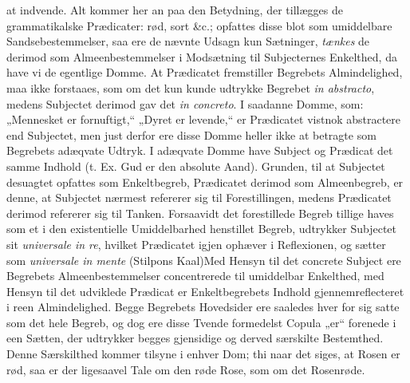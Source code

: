 \documentclass[12pt]{book}
\newcommand{\opage}[1]{\marginnote{\footnotesize\textit{[#1]}}}
\begin{document}
at indvende. Alt kommer her an
\opage{40} paa den Betydning, der tillægges de grammatikalske Prædicater: rød, sort \&c.;
opfattes disse blot som umiddelbare Sandsebestemmelser, saa ere de nævnte Udsagn
kun Sætninger, \emph{tænkes} de derimod som Almeenbestemmelser i Modsætning til
Subjecternes Enkelthed, da have vi de egentlige Domme. At Prædicatet fremstiller
Begrebets Almindelighed, maa ikke forstaaes, som om det kun kunde udtrykke
Begrebet \textit{in abstracto}, medens Subjectet derimod gav det
\textit{in concreto}. I saadanne Domme, som: „Mennesket er fornuftigt,“ „Dyret er
levende,“ er Prædicatet vistnok abstractere end Subjectet, men just derfor ere
disse Domme heller ikke at betragte som Begrebets adæqvate Udtryk. I adæqvate
Domme have Subject og Prædicat det samme Indhold (t. Ex. Gud er den absolute
Aand). Grunden, til at Subjectet desuagtet opfattes som Enkeltbegreb, Prædicatet
derimod som Almeenbegreb, er denne, at Subjectet nærmest refererer sig til
Forestillingen, medens Prædicatet derimod refererer sig til Tanken. Forsaavidt
det forestillede Begreb tillige haves som et i den existentielle Umiddelbarhed
henstillet Begreb, udtrykker Subjectet sit \textit{universale in re}, hvilket
Prædicatet igjen ophæver i Reflexionen, og sætter som \textit{universale in
mente} (Stilpons Kaal)\quad Med Hensyn til det concrete Subject ere Begrebets
Almeenbestemmelser concentrerede til umiddelbar Enkelthed, med Hensyn til det
udviklede Prædicat er Enkeltbegrebets Indhold gjennemreflecteret i reen
Almindelighed. Begge Begrebets Hovedsider ere saaledes hver for sig satte som det
hele Begreb, og dog ere disse Tvende formedelst Copula „er“ forenede i een
Sætten, der udtrykker begges gjensidige og derved særskilte Bestemthed. Denne
Særskilthed kommer tilsyne i enhver Dom; thi naar det siges, at
\opage{41} Rosen er rød, saa er der ligesaavel Tale om den røde Rose, som om det Rosenrøde.
\end{document}
